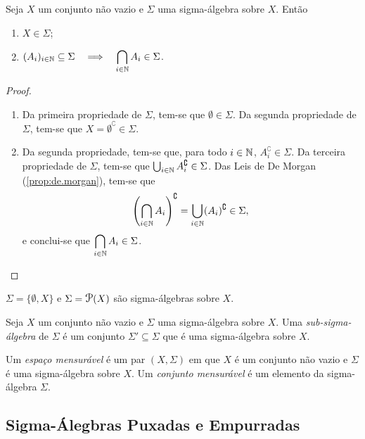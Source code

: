 \begin{prop}
	Seja $X$ um conjunto não vazio e $\Sigma$ uma sigma-álgebra sobre $X$. Então
	\begin{enumerate}
	\item $X \in \Sigma$;
	\item $(A_i)_{i \in \mathbb{N}} \subseteq \Sigma \quad \Longrightarrow \quad \displaystyle \bigcap_{i \in \mathbb{N}} A_i \in \Sigma$.
	\end{enumerate}
\end{prop}
\begin{proof}
	\begin{enumerate}
	\item Da primeira propriedade de $\Sigma$, tem-se que $\emptyset \in \Sigma$. Da segunda propriedade de $\Sigma$, tem-se que $X = \emptyset^\complement \in \Sigma$.
	\item Da segunda propriedade, tem-se que, para todo $i \in \mathbb{N}$, $A_i^\complement \in \Sigma$. Da terceira propriedade de $\Sigma$, tem-se que $\bigcup_{i \in \mathbb{N}} A_i^\complement \in \Sigma$. Das Leis de De Morgan (\ref{prop:de.morgan}), tem-se que
	\begin{equation*}
	\left(\bigcap_{i \in \mathbb{N}} A_i \right)^\complement = \bigcup_{i \in \mathbb{N}} (A_i)^\complement \in \Sigma,
	\end{equation*}
e conclui-se que $\displaystyle\bigcap_{i \in \mathbb{N}} A_i \in \Sigma$.
	\end{enumerate}
\end{proof}

\begin{ex}
	$\Sigma = \{\emptyset,X\}$ e $\Sigma = \p(X)$ são sigma-álgebras sobre $X$.
\end{ex}

\begin{defi}
	Seja $X$ um conjunto não vazio e $\Sigma$ uma sigma-álgebra sobre $X$. Uma \emph{sub-sigma-álgebra} de $\Sigma$ é um conjunto $\Sigma' \subseteq \Sigma$ que é uma sigma-álgebra sobre $X$.
\end{defi}

\begin{defi}
	Um \emph{espaço mensurável} é um par $(X,\Sigma)$ em que $X$ é um conjunto não vazio e $\Sigma$ é uma sigma-álgebra sobre $X$. Um \emph{conjunto mensurável} é um elemento da sigma-álgebra $\Sigma$.
\end{defi}

\subsection{Sigma-Álegbras Puxadas e Empurradas}

